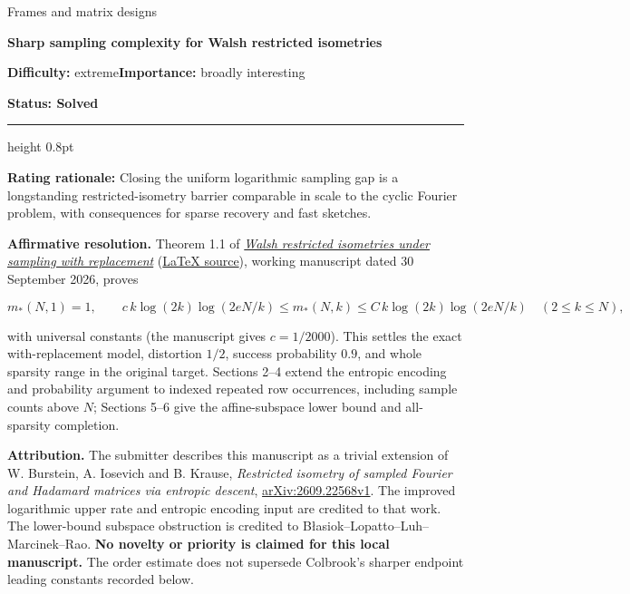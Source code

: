 \documentclass[11pt,a4paper]{article}
\makeatletter
\renewcommand{\subsection}{\Needspace{4\baselineskip}\@startsection{subsection}{2}{0pt}{9pt plus 1pt minus 1pt}{3pt}{\sffamily\bfseries\normalsize\color{ink}}}
\makeatother
\begin{document}
{\sffamily\small\color{muted}Frames and matrix designs\par}
\vspace{3pt}
{\raggedright{}\sffamily\bfseries\fontsize{21}{24}\selectfont\color{ink}Sharp
sampling complexity for Walsh restricted isometries\par}
\vspace{7pt}
{\sffamily\small\textbf{Difficulty:} extreme\quad\textbf{Importance:} broadly
interesting\par}
{\sffamily\small\bfseries\color{accent}Status: Solved\par}
\vspace{4pt}
{\color{accent}\hrule height 0.8pt}
\vspace{6pt}
\textbf{Rating rationale:} Closing the uniform logarithmic sampling gap
is a longstanding restricted-isometry barrier comparable in scale to the
cyclic Fourier problem, with consequences for sparse recovery and fast
sketches.

\subsection{Resolution --- 2026-09-30}\label{resolution-2026-09-30}

\textbf{Affirmative resolution.} Theorem 1.1 of
\href{https://github.com/ajt60gaibb/OpenProblemsInNLA/blob/main/references/haidary-resolutions-2026-09-30/Walsh_RIP_with_replacement_revised.pdf}{\emph{Walsh
restricted isometries under sampling with replacement}}
(\href{https://github.com/ajt60gaibb/OpenProblemsInNLA/blob/main/references/haidary-resolutions-2026-09-30/Walsh_RIP_with_replacement_revised.tex}{LaTeX
source}), working manuscript dated 30 September 2026, proves

\[m_*(N,1)=1,\qquad
c\,k\log(2k)\log(2eN/k)\le m_*(N,k)
\le C\,k\log(2k)\log(2eN/k)\quad(2\le k\le N),\]

with universal constants (the manuscript gives \(c=1/2000\)). This
settles the exact with-replacement model, distortion \(1/2\), success
probability \(0.9\), and whole sparsity range in the original target.
Sections 2--4 extend the entropic encoding and probability argument to
indexed repeated row occurrences, including sample counts above \(N\);
Sections 5--6 give the affine-subspace lower bound and all-sparsity
completion.

\textbf{Attribution.} The submitter describes this manuscript as a
trivial extension of W. Burstein, A. Iosevich and B. Krause,
\emph{Restricted isometry of sampled Fourier and Hadamard matrices via
entropic descent},
\href{https://arxiv.org/abs/2609.22568v1}{arXiv:2609.22568v1}. The
improved logarithmic upper rate and entropic encoding input are credited
to that work. The lower-bound subspace obstruction is credited to
Błasiok--Lopatto--Luh--Marcinek--Rao. \textbf{No novelty or priority is
claimed for this local manuscript.} The order estimate does not
supersede Colbrook's sharper endpoint leading constants recorded below.
\end{document}
